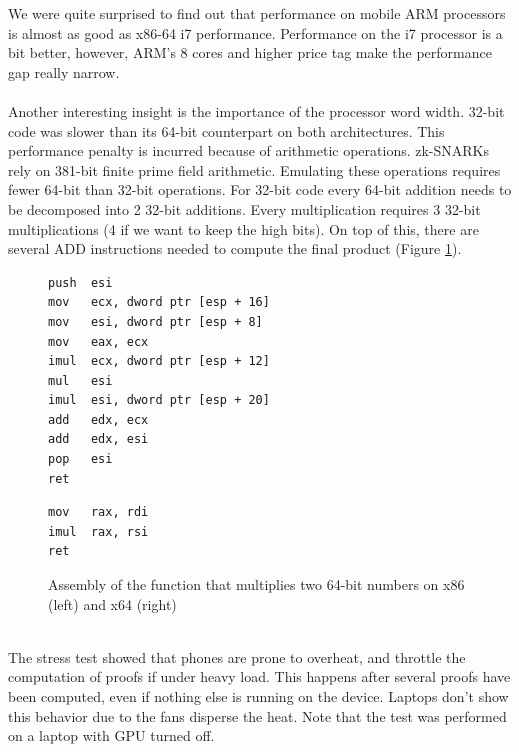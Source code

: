 We were quite surprised to find out that performance on mobile ARM processors is almost as good as x86-64 i7 performance. Performance on the i7 processor is a bit better, however, ARM's 8 cores and higher price tag make the performance gap really narrow.\\
\\
Another interesting insight is the importance of the processor word width. 32-bit code was slower than its 64-bit counterpart on both architectures. This performance penalty is incurred because of arithmetic operations. zk-SNARKs rely on 381-bit finite prime field arithmetic. Emulating these operations requires fewer 64-bit than 32-bit operations. For 32-bit code every 64-bit addition needs to be decomposed into 2 32-bit additions. Every multiplication requires 3 32-bit multiplications (4 if we want to keep the high bits). On top of this, there are several ADD instructions needed to compute the final product (Figure \ref{fig:mulcomp}).\\
\begin{figure}[h]
    \centering
    \begin{minipage}[t]{0.45\linewidth}
        \begin{lstlisting}[basicstyle=\small,language={[x86masm]Assembler}]
push  esi
mov   ecx, dword ptr [esp + 16]
mov   esi, dword ptr [esp + 8]
mov   eax, ecx
imul  ecx, dword ptr [esp + 12]
mul   esi
imul  esi, dword ptr [esp + 20]
add   edx, ecx
add   edx, esi
pop   esi
ret
        \end{lstlisting}
        \end{minipage}%
        \hfill\vrule\hfill
        \begin{minipage}[t]{0.45\linewidth}
        \begin{lstlisting}[basicstyle=\small,language={[x64]Assembler}]
mov   rax, rdi
imul  rax, rsi
ret
        \end{lstlisting}
        \end{minipage}

        \caption{Assembly of the function that multiplies two 64-bit numbers on x86 (left) and x64 (right)}
        \label{fig:mulcomp}
\end{figure}
\\
The stress test showed that phones are prone to overheat, and throttle the computation of proofs if under heavy load. This happens after several proofs have been computed, even if nothing else is running on the device. Laptops don't show this behavior due to the fans disperse the heat. Note that the test was performed on a laptop with GPU turned off.

